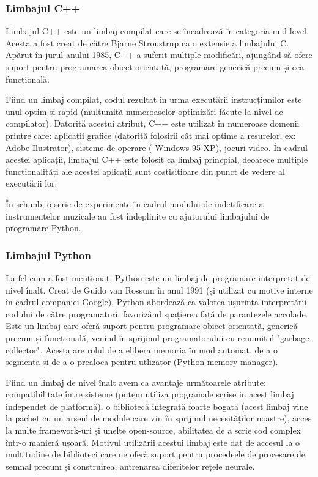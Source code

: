 \documentclass[a4paper,12pt]{report}
\begin{document}
  	\subsubsection{Limbajul C++}
  	Limbajul C++  este un limbaj compilat care se încadrează în categoria mid-level. Acesta a fost creat de către Bjarne Stroustrup ca o extensie a limbajului C. Apărut în jurul anului 1985, C++ a suferit multiple modificări, ajungând să ofere suport pentru programarea obiect orientată, programare generică precum și cea funcțională. 
  	
  	Fiind un limbaj compilat, codul rezultat în urma executării instrucțiunilor este unul optim și rapid (mulțumită numeroaselor optimizări făcute la nivel de compilator). Datorită acestui atribut, C++ este utilizat în numeroase domenii printre care: aplicații grafice (datorită folosirii cât mai optime a resurelor, ex: Adobe Ilustrator), sisteme de operare ( Windows 95-XP), jocuri video. În cadrul acestei aplicații, limbajul C++ este folosit ca limbaj princpial, deoarece multiple functionalități ale acestei aplicații sunt costisitioare din punct de vedere al executării lor. 
  	
  	În schimb, o serie de experimente în cadrul modului de indetificare a instrumentelor muzicale au fost îndeplinite cu ajutorului limbajului de programare Python. 
  	
  	\subsubsection{Limbajul Python}
  	La fel cum a fost menționat, Python este un limbaj de programare interpretat de nivel înalt. Creat de Guido van Rossum în anul  1991 (și utilizat cu motive interne în cadrul companiei Google), Python abordează ca valorea ușurința interpretării codului de către programatori, favorizând spațierea față de parantezele accolade. Este un limbaj care oferă suport pentru programare obiect orientată, generică precum și funcțională, venind în sprijinul programatorului cu renumitul "garbage-collector". Acesta are rolul de a elibera memoria în mod automat, de a o segmenta și de a o prealoca pentru utlizator (Python memory manager). 
  	
  	Fiind un limbaj de nivel înalt avem ca avantaje următoarele atribute: compatibilitate între sisteme (putem utiliza programale scrise in acest limbaj independet de platformă), o bibliotecă integrată foarte bogată (acest limbaj vine la pachet cu un arsenl de module care vin în sprijinul necesităților noastre), acces la multe framework-uri și unelte open-source, abilitatea de a scrie cod complex într-o manieră ușoară. Motivul utilizării acestui limbaj este dat de accesul la o multitudine de biblioteci care ne oferă suport pentru procedeele de procesare de semnal precum și construirea, antrenarea diferitelor rețele neurale.
  	
\end{document}
